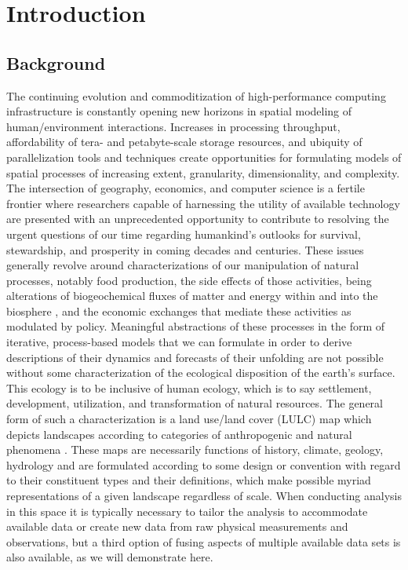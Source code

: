 
\chapter{Introduction}
\label{cha:introduction}

\section{Background}
\label{sec:background}

The continuing evolution and commoditization of high-performance
computing infrastructure is constantly opening new horizons in spatial
modeling of human\slash environment interactions.  Increases in
processing throughput, affordability of tera- and petabyte-scale
storage resources, and ubiquity of parallelization tools and
techniques create opportunities for formulating models of spatial
processes of increasing extent, granularity, dimensionality, and
complexity.  The intersection of geography, economics, and computer
science is a fertile frontier where researchers capable of harnessing
the utility of available technology are presented with an
unprecedented opportunity to contribute to resolving the urgent
questions of our time regarding humankind's outlooks for survival,
stewardship, and prosperity in coming decades and centuries.  These
issues generally revolve around characterizations of our manipulation
of natural processes, notably food production, the side effects of
those activities, being alterations of biogeochemical fluxes of matter
and energy within and into the biosphere \citep{Sellers1997}, and the
economic exchanges that mediate these activities as modulated by
policy.  Meaningful abstractions of these processes in the form of
iterative, process-based models that we can formulate in order to
derive descriptions of their dynamics and forecasts of their unfolding
are not possible without some characterization of the ecological
disposition of the earth's surface.  This ecology is to be inclusive
of human ecology, which is to say settlement, development,
utilization, and transformation of natural resources.  The general
form of such a characterization is a land use\slash land cover (LULC)
map which depicts landscapes according to categories of anthropogenic
and natural phenomena \citep{Fisher2005a}.   These maps are necessarily functions
of history, climate, geology, hydrology and are formulated according
to some design or convention with regard to their constituent types
and their definitions, which make possible myriad representations of a
given landscape regardless of scale.  When conducting analysis in this
space it is typically necessary to tailor the analysis to accommodate
available data or create new data from raw physical measurements and
observations, but a third option of fusing aspects of multiple
available data sets is also available, as we will demonstrate here.

